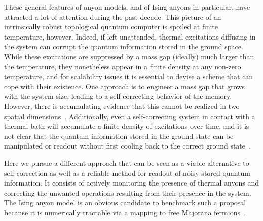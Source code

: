 \documentclass[aps, prl, letterpaper, twocolumn, superscriptaddress, notitlepage]{revtex4-1}
\begin{document}
These general features of anyon models, and of Ising anyons in particular, have attracted a lot of attention during the past decade. This picture of an intrinsically robust topological quantum computer is spoiled at finite temperature, however. Indeed, if left unattended, thermal excitations diffusing in the system can corrupt the quantum information stored in the ground space. While these excitations are suppressed by a mass gap (ideally) much larger than the temperature, they nonetheless appear in a finite density at any non-zero temperature, and for scalability issues it is essential to devise a scheme that can cope with their existence. One approach is to engineer a mass gap that grows with the system size, leading to a self-correcting behavior of the memory. However, there is accumulating evidence that this cannot be realized in two spatial dimensions~\cite{Bravyi2009, Bravyi2010a, Haah2012a, Landon-Cardinal2012a}. Additionally, even a self-correcting system in contact with a thermal bath will accumulate a finite density of excitations over time, and it is not clear that the quantum information stored in the ground state can be manipulated or readout without first cooling back to the correct ground state~\cite{Pastawski2010}.

Here we pursue a different approach that can be seen as a viable alternative to self-correction as well as a reliable method for readout of noisy stored quantum information. It consists of actively monitoring the presence of thermal anyons and correcting the unwanted operations resulting from their presence in the system. The Ising anyon model is an obvious candidate to benchmark such a proposal because it is numerically tractable via a mapping to free Majorana fermions~\cite{Bravyi2006b}.
\end{document}
